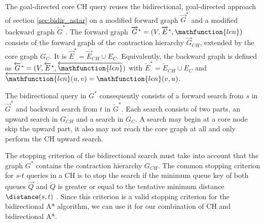 The goal-directed core CH query reuses the bidirectional, goal-directed approach of section \ref{sec:bidir_astar} on a modified forward graph $\overrightarrow{G}^*$ and a modified backward graph $\overleftarrow{G}^*$. The forward graph $\overrightarrow{G}^* = (V,\overrightarrow{E}^*,\mathfunction{len})$ consists of the forward graph of the contraction hierarchy $\overrightarrow{G}_{CH}$, extended by the core graph $G_C$. It is $\overrightarrow{E}^* = \overrightarrow{E}_{CH} \cup E_C $. Equivalently, the backward graph is defined as $\overleftarrow{G}^* = (V,\overleftarrow{E}^*,\overleftarrow{\mathfunction{len}})$ with $\overleftarrow{E}^* = \overleftarrow{E}_{CH} \cup E_C$ and $\overleftarrow{\mathfunction{len}}(u,v) = \mathfunction{len}(v,u)$.

The bidirectional query in $G^*$ consequently consists of a forward search from $s$ in $\overrightarrow{G}^*$ and backward search from $t$ in $\overleftarrow{G}^*$. Each search consists of two parts, an upward search in $G_{CH}$ and a search in $G_C$. A search may begin at a core node skip the upward part, it also may not reach the core graph at all and only perform the CH upward search.

The stopping criterion of the bidirectional search must take into account that the graph $G^*$ contains the contraction hierarchy $G_{CH}$. The common stopping criterion for $s$-$t$ queries in a CH is to stop the search if the minimum queue key of both queues $\overrightarrow{Q}$ and $\overleftarrow{Q}$ is greater or equal to the tentative minimum distance $\distance(s,t)$ \cite{geisberger:2012}. Since this criterion is a valid stopping criterion for the bidirectional A* algorithm, we can use it for our combination of CH and bidirectional A*.

